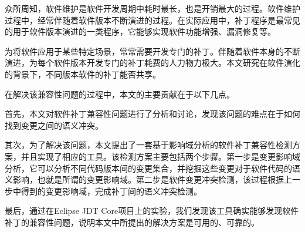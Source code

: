 

\begin{cabstract} 
	众所周知，软件维护是软件开发周期中耗时最长，也是开销最大的过程。软件维护过程中，经常伴随着软件版本不断演进的过程。在实际应用中，补丁程序是最常见的用于软件版本演进的一类程序，它能够实现软件功能增强、漏洞修复等。
	
	为将软件应用于某些特定场景，常常需要开发专门的补丁。伴随着软件本身的不断演进，为每个软件版本开发专门的补丁耗费的人力物力极大。本文研究在软件演化的背景下，不同版本软件的补丁能否共享。
	
	在解决该兼容性问题的过程中，本文的主要贡献在于以下几点。
	
	首先，本文对软件补丁兼容性问题进行了分析和讨论，发现该问题的难点在于如何找到变更之间的语义冲突。
	
	其次，为了解决该问题，本文提出了一套基于影响域分析的软件补丁兼容性检测方案，并且实现了相应的工具。该检测方案主要包括两个步骤。第一步是变更影响域分析，它可以分析不同代码版本间的变更集合，并挖掘这些变更对于软件代码的语义影响，也就是所谓的变更影响域。第二步是软件变更冲突检测，该过程根据上一步中得到的变更影响域，完成补丁间的语义冲突检测。
	
	最后，通过在Eclipse JDT Core项目上的实验，我们发现该工具确实能够发现软件补丁的兼容性问题，说明本文中所提出的解决方案是可用的、可靠的。
\end{cabstract}


